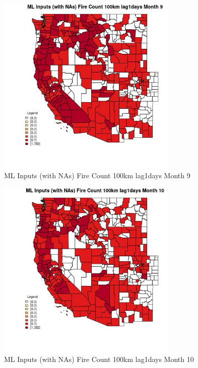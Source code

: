 \clearpage 

\begin{figure} 
\centering  
\includegraphics[width=0.77\textwidth]{Code_Outputs/Report_ML_input_PM25_Step4_part_e_de_duplicated_aves_compiled_2019-05-21wNAs_CountyFire_Count_100km_lag1daysmedianMonth9.jpg} 
\caption{\label{fig:Report_ML_input_PM25_Step4_part_e_de_duplicated_aves_compiled_2019-05-21wNAsCountyFire_Count_100km_lag1daysmedianMonth9}ML Inputs (with NAs) Fire Count 100km lag1days Month 9} 
\end{figure} 
 

\begin{figure} 
\centering  
\includegraphics[width=0.77\textwidth]{Code_Outputs/Report_ML_input_PM25_Step4_part_e_de_duplicated_aves_compiled_2019-05-21wNAs_CountyFire_Count_100km_lag1daysmedianMonth10.jpg} 
\caption{\label{fig:Report_ML_input_PM25_Step4_part_e_de_duplicated_aves_compiled_2019-05-21wNAsCountyFire_Count_100km_lag1daysmedianMonth10}ML Inputs (with NAs) Fire Count 100km lag1days Month 10} 
\end{figure} 
 

